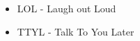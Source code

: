 
\begin{itemize}

\item LOL - Laugh out Loud
\item TTYL - Talk To You Later

\end{itemize}

\pagestyle{myheadings}
